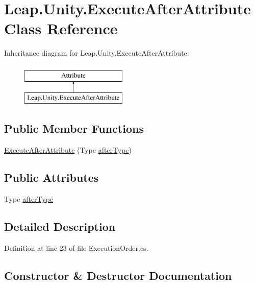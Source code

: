 \hypertarget{class_leap_1_1_unity_1_1_execute_after_attribute}{}\section{Leap.\+Unity.\+Execute\+After\+Attribute Class Reference}
\label{class_leap_1_1_unity_1_1_execute_after_attribute}
Inheritance diagram for Leap.\+Unity.\+Execute\+After\+Attribute\+:\begin{figure}[H]
\begin{center}
\leavevmode
\includegraphics[height=2.000000cm]{class_leap_1_1_unity_1_1_execute_after_attribute}
\end{center}
\end{figure}
\subsection*{Public Member Functions}
\begin{DoxyCompactItemize}
\item 
\mbox{\hyperlink{class_leap_1_1_unity_1_1_execute_after_attribute_a0c3bf3e63c63e1fa745ed7a09ac48d65}{Execute\+After\+Attribute}} (Type \mbox{\hyperlink{class_leap_1_1_unity_1_1_execute_after_attribute_a50644f274a35730d97a1d96006a2dd2a}{after\+Type}})
\end{DoxyCompactItemize}
\subsection*{Public Attributes}
\begin{DoxyCompactItemize}
\item 
Type \mbox{\hyperlink{class_leap_1_1_unity_1_1_execute_after_attribute_a50644f274a35730d97a1d96006a2dd2a}{after\+Type}}
\end{DoxyCompactItemize}


\subsection{Detailed Description}


Definition at line 23 of file Execution\+Order.\+cs.



\subsection{Constructor \& Destructor Documentation}
\mbox{\label{class_leap_1_1_unity_1_1_execute_after_attribute_a0c3bf3e63c63e1fa745ed7a09ac48d65}} 
